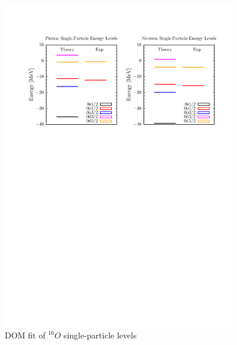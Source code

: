 \begin{figure}
\begin{center}
\includegraphics[width = 0.9\textwidth]{figures/o16_SPLevels.png}
\caption{DOM fit of $^{16}O$ single-particle levels}
\label{o16SPLevels}
\end{center}
\end{figure}

